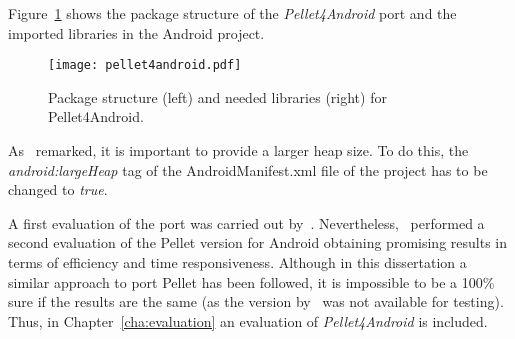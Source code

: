 Figure~\ref{fig:pellet4android} shows the package structure of the
\textit{Pellet4Android} port and the imported libraries in the Android project.
% 

\begin{figure}[H]
\centering
\texttt{[image: pellet4android.pdf]}
\caption{Package structure (left) and needed libraries (right) for Pellet4Android.}
\label{fig:pellet4android}
\end{figure}


As~\citet{yus_android_2013} remarked, it is important to provide a larger heap
size. To do this, the \textit{android:largeHeap} tag of the AndroidManifest.xml 
file of the project has to be changed to \textit{true}.

A first evaluation of the port was carried out by~\citet{yus_android_2013}.
Nevertheless,~\citet{bobed_android_2014} performed a second evaluation of the
Pellet version for Android obtaining promising results in terms of efficiency
and time responsiveness. Although in this dissertation a similar approach to port 
Pellet has been followed, it is impossible to be a 100\% sure if the results are 
the same (as the version by~\citet{yus_android_2013} was not available for testing). 
Thus, in Chapter~\ref{cha:evaluation} an evaluation of \textit{Pellet4Android} is 
included.

